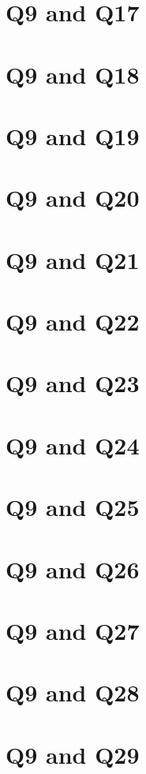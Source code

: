 \documentclass{report}
\begin{document}
\section{Q9 and Q17}\clearpage
\section{Q9 and Q18}\clearpage
\section{Q9 and Q19}\clearpage
\section{Q9 and Q20}\clearpage
\section{Q9 and Q21}\clearpage
\section{Q9 and Q22}\clearpage
\section{Q9 and Q23}\clearpage
\section{Q9 and Q24}\clearpage
\section{Q9 and Q25}\clearpage
\section{Q9 and Q26}\clearpage
\section{Q9 and Q27}\clearpage
\section{Q9 and Q28}\clearpage
\section{Q9 and Q29}\clearpage
\end{document}
